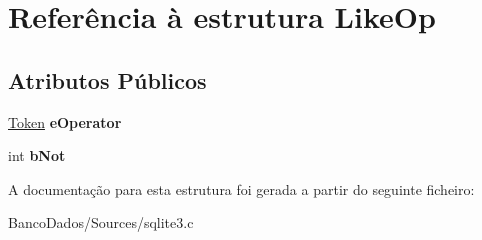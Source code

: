 \hypertarget{struct_like_op}{\section{Referência à estrutura Like\-Op}
\label{struct_like_op}
}
\subsection*{Atributos Públicos}
\begin{DoxyCompactItemize}
\item 
\hypertarget{struct_like_op_a02dccb0eea9610285333434a755acae8}{\hyperlink{struct_token}{Token} {\bfseries e\-Operator}}\label{struct_like_op_a02dccb0eea9610285333434a755acae8}

\item 
\hypertarget{struct_like_op_a09daccf65c917f32e8b60b347e8893cf}{int {\bfseries b\-Not}}\label{struct_like_op_a09daccf65c917f32e8b60b347e8893cf}

\end{DoxyCompactItemize}


A documentação para esta estrutura foi gerada a partir do seguinte ficheiro\-:\begin{DoxyCompactItemize}
\item 
Banco\-Dados/\-Sources/sqlite3.\-c\end{DoxyCompactItemize}
